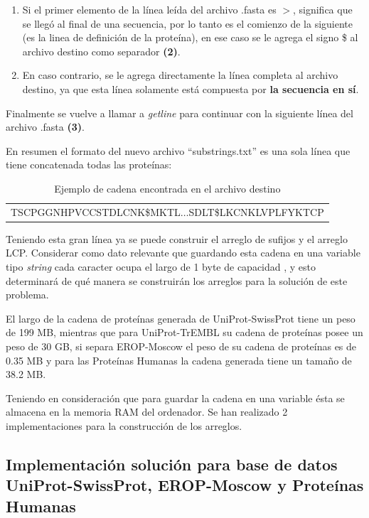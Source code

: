 \begin{enumerate}
\item Si el primer elemento de la línea leída del archivo .fasta es $>$, significa que se llegó al final de una secuencia, por lo tanto es el comienzo de la siguiente (es la linea de definición de la proteína), en ese caso se le agrega el signo \$ al archivo destino como separador \textbf{(2)}. 
\item En caso contrario, se le agrega directamente la línea completa al archivo destino, ya que esta línea solamente está compuesta por \textbf{la secuencia en sí}.
\end{enumerate}

Finalmente se vuelve a llamar a \textit{getline} para continuar con la siguiente línea del archivo .fasta \textbf{(3)}.

En resumen el formato del nuevo archivo ``substrings.txt'' es una sola línea que tiene concatenada todas las proteínas:

\begin{table}[h]
\centering
\label{propuesta-23}
\begin{tabular}{c}
TSCPGGNHPVCCSTDLCNK\$MKTL$\ldots$SDLT\$LKCNKLVPLFYKTCP\\ 
\end{tabular}
\caption{Ejemplo de cadena encontrada en el archivo destino}
\end{table}

Teniendo esta gran línea ya se puede construir el arreglo de sufijos y el arreglo LCP. Considerar como dato relevante que guardando esta cadena en una variable tipo \textit{string} cada caracter ocupa el largo de 1 byte de capacidad \cite{manipulatingstrings}, y esto determinará de qué manera se construirán los arreglos para la solución de este problema.

El largo de la cadena de proteínas generada de UniProt-SwissProt tiene un peso de 199 MB, mientras que para UniProt-TrEMBL su cadena de proteínas posee un peso de 30 GB, si separa EROP-Moscow el peso de su cadena de proteínas es de 0.35 MB y para las Proteínas Humanas la cadena generada tiene un tamaño de 38.2 MB.

Teniendo en consideración que para guardar la cadena en una variable ésta se almacena en la memoria RAM del ordenador. Se han realizado 2 implementaciones para la construcción de los arreglos.

\subsection{Implementación solución para base de datos UniProt-SwissProt, EROP-Moscow y Proteínas Humanas}

